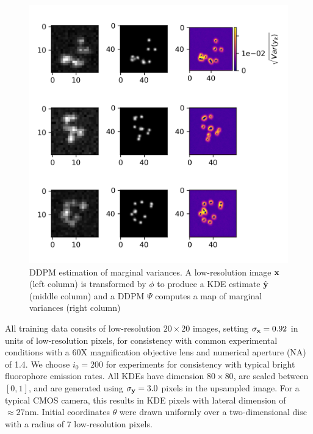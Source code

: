 \documentclass{article}
\begin{document}
\begin{figure}
\centering
\includegraphics[scale=1.2]{Bayes.png}
\caption{DDPM estimation of marginal variances. A low-resolution image $\bold{x}$ (left column) is transformed by $\phi$ to produce a KDE estimate $\hat{\bold{y}}$ (middle column) and a DDPM $\Psi$ computes a map of marginal variances (right column)}
\end{figure}

All training data consits of low-resolution $20\times 20$ images, setting $\sigma_{\bold{x}}=0.92$ in units of low-resolution pixels, for consistency with common experimental conditions with a 60X magnification objective lens and numerical aperture (NA) of 1.4. We choose $i_{0}=200$ for experiments for consistency with typical bright fluorophore emission rates. All KDEs have dimension $80\times 80$, are scaled between $[0,1]$, and are generated using $\sigma_{\bold{y}}=3.0$ pixels in the upsampled image. For a typical CMOS camera, this results in KDE pixels with lateral dimension of $\approx 27\mathrm{nm}$. Initial coordinates $\theta$ were drawn uniformly over a two-dimensional disc with a radius of 7 low-resolution pixels.
\end{document}
